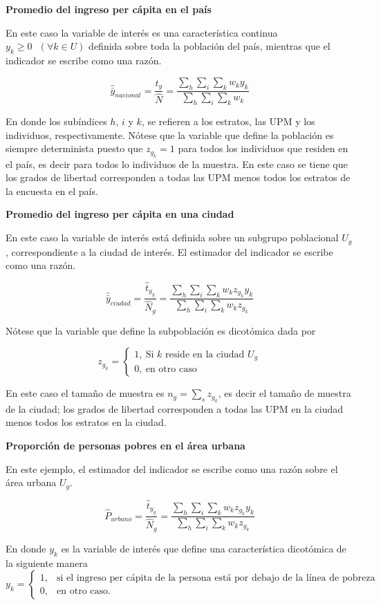 \documentclass[12pt,spanish,]{book}
\begin{document}
\textbf{Promedio del ingreso per cápita en el país}

En este caso la variable de interés es una característica continua \(y_k \geq 0 \ \ \ (\forall k \in U)\) definida sobre toda la población del país, mientras que el indicador se escribe como una razón.

\[
\hat {\bar y}_{nacional} = \frac{\hat t_y}{\hat N} =\frac{\sum_h\sum_i\sum_k w_ky_{k}}{\sum_h\sum_i\sum_k w_k}
\]

En donde los subíndices \(h\), \(i\) y \(k\), se refieren a los estratos, las UPM y los individuos, respectivamente. Nótese que la variable que define la población es siempre determinista puesto que \(z_{g_k} = 1\) para todos los individuos que residen en el país, es decir para todos lo individuos de la muestra. En este caso se tiene que los grados de libertad corresponden a todas las UPM menos todos los estratos de la encuesta en el país.

\textbf{Promedio del ingreso per cápita en una ciudad}

En este caso la variable de interés está definida sobre un subgrupo poblacional \(U_g\), correspondiente a la ciudad de interés. El estimador del indicador se escribe como una razón.

\[
\hat {\bar y}_{ciudad}= \frac{\hat t_{y_g}}{\hat N_g} =\frac{\sum_h\sum_i\sum_k w_kz_{g_k}y_{k}}{\sum_h\sum_i\sum_k w_kz_{g_k}}
\]

Nótese que la variable que define la subpoblación es dicotómica dada por

\[ 
z_{g_k}=
\begin{cases}
1, \ \text{Si $k$ reside en la ciudad $U_g$} \\
0, \ \text{en otro caso}
\end{cases}
\]

En este caso el tamaño de muestra es \(n_g = \sum_s z_{g_k}\), es decir el tamaño de muestra de la ciudad; los grados de libertad corresponden a todas las UPM en la ciudad menos todos los estratos en la ciudad.

\textbf{Proporción de personas pobres en el área urbana}

En este ejemplo, el estimador del indicador se escribe como una razón sobre el área urbana \(U_g\).

\[
\hat{P}_{urbano} = \frac{\hat t_{y_g}}{\hat N_g} =\frac{\sum_h\sum_i\sum_k w_kz_{g_k}y_{k}}{\sum_h\sum_i\sum_k w_kz_{g_k}}
\]

En donde \(y_{k}\) es la variable de interés que define una característica dicotómica de la siguiente manera
\[
y_k=
\begin{cases}
1, &\text{si el ingreso per cápita de la persona está por debajo de la línea de pobreza}\\
0, &\text{en otro caso.}
\end{cases}
\]
\end{document}
